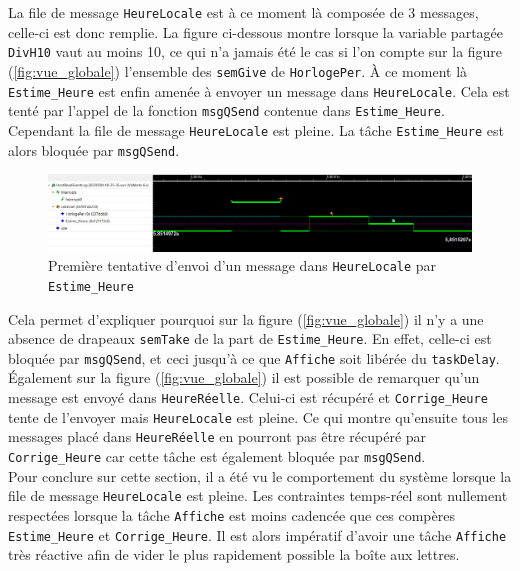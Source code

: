 \documentclass[french]{article}
\begin{document}
	La file de message \texttt{HeureLocale} est à ce moment là composée de 3 messages, celle-ci est donc remplie. La figure ci-dessous montre lorsque la variable partagée \texttt{DivH10} vaut au moins 10, ce qui n'a jamais été le cas si l'on compte sur la figure (\ref{fig:vue_globale}) l'ensemble des \texttt{semGive} de \texttt{HorlogePer}. À ce moment là \texttt{Estime\_Heure} est enfin amenée à envoyer un message dans \texttt{HeureLocale}. Cela est tenté par l'appel de la fonction \texttt{msgQSend} contenue dans \texttt{Estime\_Heure}. Cependant la file de message \texttt{HeureLocale} est pleine. La tâche \texttt{Estime\_Heure} est alors bloquée par \texttt{msgQSend}. 
	
	\begin{figure}[H]
		\centering
		\includegraphics[width=1\linewidth]{../affichage_ralenti/premiere_fois_EstimeHeure_envoi.PNG}
		\caption{Première tentative d'envoi d'un message dans \texttt{HeureLocale} par \texttt{Estime\_Heure}}
		\label{fig:premiere_fois_estime_heure_envoie}
	\end{figure}

	Cela permet d'expliquer pourquoi sur la figure (\ref{fig:vue_globale}) il n'y a une absence de drapeaux \texttt{semTake} de la part de \texttt{Estime\_Heure}. En effet, celle-ci est bloquée par \texttt{msgQSend}, et ceci jusqu'à ce que \texttt{Affiche} soit libérée du \texttt{taskDelay}. Également sur la figure (\ref{fig:vue_globale}) il est possible de remarquer qu'un message est envoyé dans \texttt{HeureRéelle}. Celui-ci est récupéré et \texttt{Corrige\_Heure} tente de l'envoyer mais \texttt{HeureLocale} est pleine. Ce qui montre qu'ensuite tous les messages placé dans \texttt{HeureRéelle} en pourront pas être récupéré par \texttt{Corrige\_Heure} car cette tâche est également bloquée par \texttt{msgQSend}.\\
	
	Pour conclure sur cette section, il a été vu le comportement du système lorsque la file de message \texttt{HeureLocale} est pleine. Les contraintes temps-réel sont nullement respectées lorsque la tâche \texttt{Affiche} est moins cadencée que ces compères \texttt{Estime\_Heure} et \texttt{Corrige\_Heure}. Il est alors impératif d'avoir une tâche \texttt{Affiche} très réactive afin de vider le plus rapidement possible la boîte aux lettres.
\end{document}
